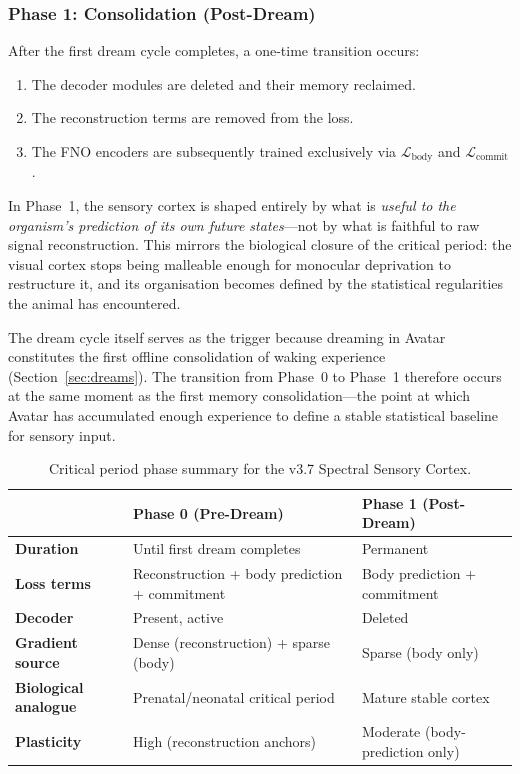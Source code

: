 \subsubsection{Phase 1: Consolidation (Post-Dream)}
\label{sec:phase1}

After the first dream cycle completes, a one-time transition occurs:
\begin{enumerate}
    \item The decoder modules are deleted and their memory reclaimed.
    \item The reconstruction terms are removed from the loss.
    \item The FNO encoders are subsequently trained exclusively via
        $\mathcal{L}_{\mathrm{body}}$ and $\mathcal{L}_{\mathrm{commit}}$.
\end{enumerate}

In Phase~1, the sensory cortex is shaped entirely by what is \emph{useful to the
organism's prediction of its own future states}---not by what is faithful to raw signal
reconstruction.
This mirrors the biological closure of the critical period: the visual cortex stops
being malleable enough for monocular deprivation to restructure it, and its
organisation becomes defined by the statistical regularities the animal has
encountered.

The dream cycle itself serves as the trigger because dreaming in Avatar constitutes
the first offline consolidation of waking experience (Section~\ref{sec:dreams}).
The transition from Phase~0 to Phase~1 therefore occurs at the same moment as the
first memory consolidation---the point at which Avatar has accumulated enough
experience to define a stable statistical baseline for sensory input.

\begin{table}[h]
\centering
\caption{Critical period phase summary for the v3.7 Spectral Sensory Cortex.}
\label{tab:critical_period}
\small
\begin{tabularx}{\columnwidth}{lXX}
\toprule
 & \textbf{Phase 0 (Pre-Dream)} & \textbf{Phase 1 (Post-Dream)} \\
\midrule
\textbf{Duration} & Until first dream completes & Permanent \\
\textbf{Loss terms} & Reconstruction + body prediction + commitment & Body prediction + commitment \\
\textbf{Decoder} & Present, active & Deleted \\
\textbf{Gradient source} & Dense (reconstruction) + sparse (body) & Sparse (body only) \\
\textbf{Biological analogue} & Prenatal/neonatal critical period & Mature stable cortex \\
\textbf{Plasticity} & High (reconstruction anchors) & Moderate (body-prediction only) \\
\bottomrule
\end{tabularx}
\end{table}

